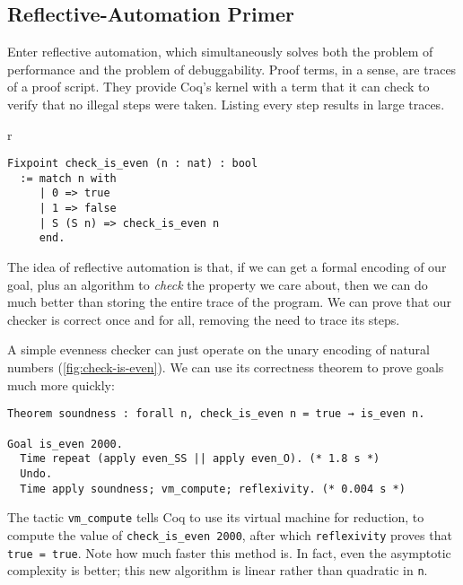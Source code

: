\subsection{Reflective-Automation Primer}\label{sec:evenness}
Enter reflective automation, which simultaneously solves both the problem of performance and the problem of debuggability.
Proof terms, in a sense, are traces of a proof script.
They provide Coq's kernel with a term that it can check to verify that no illegal steps were taken.
Listing every step results in large traces.


\begin{wrapfigure}[8]{r}{}
\begin{verbatim}
Fixpoint check_is_even (n : nat) : bool
  := match n with
     | 0 => true
     | 1 => false
     | S (S n) => check_is_even n
     end.
\end{verbatim}
\caption{Evenness Checking}\label{fig:check-is-even}
\end{wrapfigure}
The idea of reflective automation is that, if we can get a formal encoding of our goal, plus an algorithm to \emph{check} the property we care about, then we can do much better than storing the entire trace of the program.
We can prove that our checker is correct once and for all, removing the need to trace its steps.

A simple evenness checker can just operate on the unary encoding of natural numbers (\autoref{fig:check-is-even}).
We can use its correctness theorem to prove goals much more quickly:
\begin{verbatim}
Theorem soundness : forall n, check_is_even n = true → is_even n.

Goal is_even 2000.
  Time repeat (apply even_SS || apply even_O). (* 1.8 s *)
  Undo.
  Time apply soundness; vm_compute; reflexivity. (* 0.004 s *)
\end{verbatim}
The tactic \texttt{vm_compute} tells Coq to use its virtual machine for reduction, to compute the value of \texttt{check_is_even 2000}, after which \texttt{reflexivity} proves that \texttt{true = true}.
Note how much faster this method is.
In fact, even the asymptotic complexity is better; this new algorithm is linear rather than quadratic in \texttt{n}.

